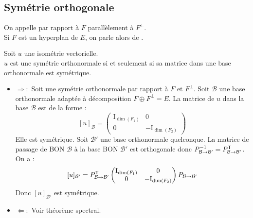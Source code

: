 \documentclass{book}
\begin{document}
\subsection{Symétrie orthogonale}
\begin{Definition}
On appelle  par rapport à $F$ parallèlement à $F^{\perp}$.\\
Si $F$ est un hyperplan de $E$, on parle alors de .
\end{Definition}
\begin{Proposition}
Soit $u$ une isométrie vectorielle.\\
$u$ est une symétrie orthonormale si et seulement si sa matrice dans une base orthonormale est symétrique.  
\end{Proposition}
\begin{Demonstration}

\begin{itemize}
\item $\Longrightarrow :$ Soit une symétrie orthonormale par rapport à $F$ et $F^{\perp}$. Soit $\mathcal{B}$ une base orthonormale adaptée à décomposition  $F\oplus F^{\perp}=E.$ La matrice de $u$ dans la base $\mathcal{B}$ est de la forme :
$$[u]_\mathcal{B}= \begin{pmatrix}\mathrm {I}_{\dim(F_1)}&\mathrm {0}\\\mathrm {0} & -\mathrm {I}_{\dim(F_2)}\end{pmatrix}$$
Elle est symétrique. Soit $\mathcal{B}'$ une base orthonormale quelconque. La matrice de passage de BON $\mathcal{B}$ à la base BON $\mathcal{B}'$ est orthogonale donc $P^{-1}_{\mathcal{B}\to\mathcal{B}' }=P_{\mathcal{B}\to\mathcal{B}'}^{\mathsf {T}}$. On a : 
$$[u]_{\mathcal{B}'}= P_{\mathcal{B}\to\mathcal{B}'}^{\mathsf {T}} \begin{pmatrix}\mathrm {I}_{\dim(F_1)}&\mathrm {0}\\\mathrm {0} & -\mathrm {I}_{\dim(F_2)}\end{pmatrix}P_{\mathcal{B}\to\mathcal{B}'}$$
Donc $[u]_{\mathcal{B}'}$ est symétrique.
\item $\Longleftarrow :$ Voir théorème spectral.
\end{itemize}
\end{Demonstration}
\end{document}
